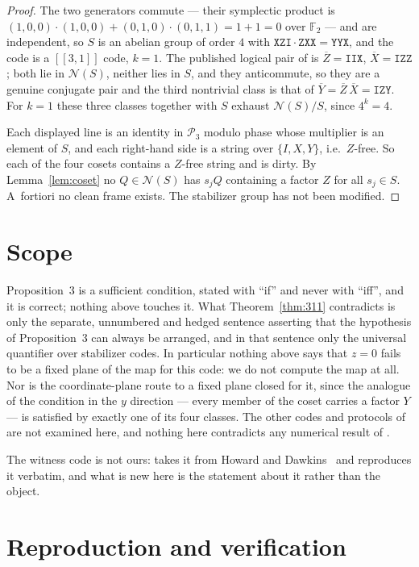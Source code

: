 \documentclass[11pt]{amsart}
\theoremstyle{remark}
\theoremstyle{definition}
\newcommand{\PP}{\mathcal P}
\newcommand{\NN}{\mathcal N}
\newcommand{\Zb}{\overline Z}
\newcommand{\Xb}{\overline X}
\newcommand{\Yb}{\overline Y}
\newcommand{\str}[1]{\texttt{#1}}
\begin{document}
\begin{proof}
The two generators commute --- their symplectic product is
$(1,0,0)\cdot(1,0,0)+(0,1,0)\cdot(0,1,1)=1+1=0$ over $\mathbb F_2$ --- and are independent, so
$S$ is an abelian group of order $4$ with $\str{XZI}\cdot\str{ZXX}=\str{YYX}$, and the code is a
$[[3,1]]$ code, $k=1$. The published logical pair of \cite{ZL} is
$\Zb=\str{IIX}$, $\Xb=\str{IZZ}$; both lie in $\NN(S)$, neither lies in $S$, and they anticommute,
so they are a genuine conjugate pair and the third nontrivial class is that of
$\Yb=\Zb\,\Xb=\str{IZY}$. For $k=1$ these three classes together with $S$ exhaust $\NN(S)/S$, since
$4^k=4$.

Each displayed line is an identity in $\PP_3$ modulo phase whose multiplier is an element of $S$,
and each right-hand side is a string over $\{I,X,Y\}$, i.e.\ $Z$-free. So each of the four cosets
contains a $Z$-free string and is dirty. By Lemma~\ref{lem:coset} no $Q\in\NN(S)$ has $s_jQ$
containing a factor $Z$ for all $s_j\in S$. A~fortiori no clean frame exists. The stabilizer group
has not been modified.
\end{proof}

\section{Scope}\label{sec:scope}

Proposition~3 is a sufficient condition, stated with ``if'' and never with ``iff'', and it is
correct; nothing above touches it. What Theorem~\ref{thm:311} contradicts is only the separate,
unnumbered and hedged sentence asserting that the hypothesis of Proposition~3 can always be
arranged, and in that sentence only the universal quantifier over stabilizer codes. In particular
nothing above says that $z=0$ fails to be a fixed plane of the map for this code: we do not compute
the map at all. Nor is the coordinate-plane route to a fixed plane closed for it, since the analogue
of the condition in the $y$ direction --- every member of the coset carries a factor $Y$ --- is
satisfied by exactly one of its four classes. The other codes and protocols of \cite{ZL} are not
examined here, and nothing here contradicts any numerical result of \cite{ZL}.

The witness code is not ours: \cite{ZL} takes it from Howard and Dawkins~\cite{HD} and reproduces it
verbatim, and what is new here is the statement about it rather than the object.

\section{Reproduction and verification}
\end{document}
